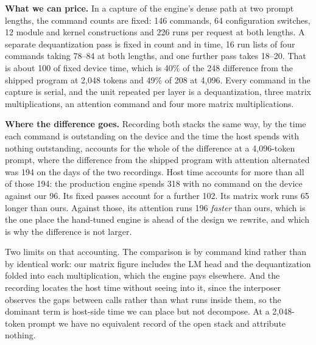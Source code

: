\textbf{What we can price.} In a capture of the engine's dense path at two prompt lengths, the command counts are
fixed: 146 commands, 64 configuration switches, 12 module and kernel constructions and 226 runs per request at both
lengths. A separate dequantization pass is fixed in count and in time, 16 run lists of four commands taking
78--84\ms{} at both lengths, and one further pass takes 18--20\ms. That is about 100\ms{} of fixed device time, which
is 40\% of the 248\ms{} difference from the shipped program at 2{,}048 tokens and 49\% of 208\ms{} at 4{,}096. Every command in the capture is
serial, and the unit repeated per layer is a dequantization, three matrix multiplications, an attention command and
four more matrix multiplications.

\textbf{Where the difference goes.} Recording both stacks the same way, by the time each command is outstanding on
the device and the time the host spends with nothing outstanding, accounts for the whole of the difference at a
4{,}096-token prompt, where the difference from the shipped program with attention alternated was 194\ms{} on the days of the two recordings. Host time accounts for more than all of those 194\ms{}: the production engine spends 318\ms{} with no command
on the device against our 96\ms. Its fixed passes account for a further 102\ms. Its matrix work runs 65\ms{} longer
than ours. Against those, its attention runs 196\ms{} \emph{faster} than ours, which is the one place the hand-tuned
engine is ahead of the design we rewrite, and which is why the difference is not larger.

Two limits on that accounting. The comparison is by command kind rather than by identical work: our matrix figure
includes the LM head and the dequantization folded into each multiplication, which the engine pays
elsewhere. And the recording locates the host time without seeing into it, since the interposer observes the gaps
between calls rather than what runs inside them, so the dominant term is host-side time we can place but not
decompose. At a 2{,}048-token prompt we have no equivalent record of the open stack and attribute nothing.
